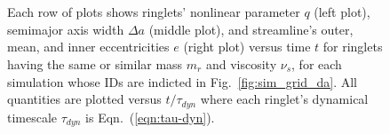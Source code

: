 \documentclass[preprint]{aastex62}
\begin{document}
\begin{figure}
    \vspace{5ex}\ \\
\end{figure}
\begin{figure}
    \vspace{5ex}\ \\
\end{figure}
\begin{figure}
    \caption{
        \label{fig:low_libration_sims}
        Each row of plots shows
        ringlets' nonlinear parameter $q$ (left plot), semimajor axis width
        $\Delta a$ (middle plot), and streamline's outer, mean, and inner eccentricities $e$ (right plot)
        versus time $t$
        for ringlets having the same or similar mass $m_r$ and viscosity $\nu_s$, for each
        simulation whose IDs are indicted in Fig.\ \ref{fig:sim_grid_da}. All quantities are plotted 
        versus $t/\tau_{dyn}$ where each ringlet's dynamical timescale $\tau_{dyn}$
        is Eqn.\ (\ref{eqn:tau-dyn}).
    }
\end{figure}
\end{document}
